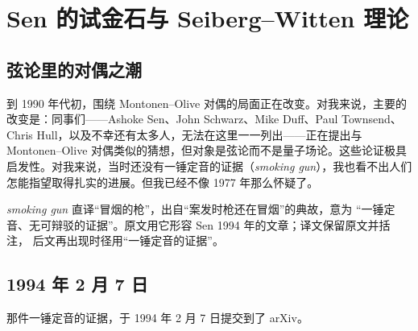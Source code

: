 \section{Sen 的试金石与 Seiberg--Witten 理论}

\par\medskip

\subsection{弦论里的对偶之潮}

到 1990 年代初，围绕 Montonen--Olive 对偶的局面正在改变。对我来说，主要的改变是：同事们——Ashoke Sen、John Schwarz、Mike Duff、Paul Townsend、Chris Hull，以及不幸还有太多人，无法在这里一一列出——正在提出与 Montonen--Olive 对偶类似的猜想，但对象是弦论而不是量子场论。这些论证极具启发性。对我来说，当时还没有一锤定音的证据（\emph{smoking gun}），我也看不出人们怎能指望取得扎实的进展。但我已经不像 1977 年那么怀疑了。

\begin{yizhu}
\textit{smoking gun} 直译“冒烟的枪”，出自“案发时枪还在冒烟”的典故，意为
“一锤定音、无可辩驳的证据”。原文用它形容 Sen 1994 年的文章；译文保留原文并括注，
后文再出现时径用“一锤定音的证据”。
\end{yizhu}


\subsection{1994 年 2 月 7 日}

那件一锤定音的证据，于 1994 年 2 月 7 日提交到了 arXiv。

